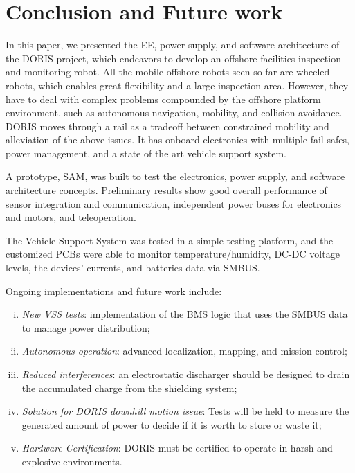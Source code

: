 \documentclass{ifacconf}
\begin{document}
\section{Conclusion and Future work}\label{sec:conclusions}
In this paper, we presented the EE, power supply, and software architecture of
the DORIS project, which endeavors to develop an offshore facilities inspection
and monitoring robot. All the mobile offshore robots seen so far are wheeled
robots, which enables great flexibility and a large inspection area. However,
they have to deal with complex problems compounded by the offshore platform
environment, such as autonomous navigation, mobility, and collision avoidance.
DORIS moves through a rail as a tradeoff between constrained
mobility and alleviation of the above issues. It has onboard electronics with
multiple fail safes, power management, and a state of the art vehicle support
system.

A prototype, SAM, was built to test the electronics, power supply, and software
architecture concepts. Preliminary results show good overall performance of
sensor integration and communication, independent power buses for electronics
and motors, and teleoperation.

The Vehicle Support System was tested in a simple testing platform, and the
customized PCBs were able to monitor temperature/humidity, DC-DC voltage levels,
the devices’ currents, and batteries data via SMBUS. 

Ongoing implementations and future work include:
\begin{enumerate}[i)]
 
  \item \emph{New VSS tests}:
  implementation of the BMS logic that uses the SMBUS data to manage power
  distribution;
  \item \emph{Autonomous operation}: advanced localization, mapping, and
  mission control; 
  \item \emph{Reduced interferences}:
  an electrostatic discharger should be designed to drain the accumulated
  charge from the shielding system;
  \item \emph{Solution for DORIS downhill motion issue}: Tests will be held to
  measure the generated amount of power to decide if it is worth to store or
  waste it;
  \item \emph{Hardware Certification}: 
  DORIS must be certified to operate in harsh and explosive environments.
\end{enumerate}



\appendix
\end{document}
